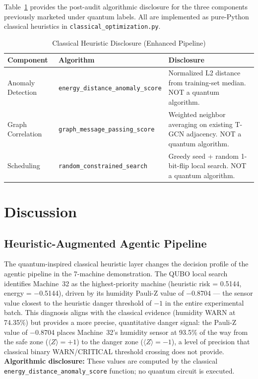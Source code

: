 Table~\ref{tab:heuristic_disclosure} provides the post-audit algorithmic disclosure for the three components previously marketed under quantum labels. All are implemented as pure-Python classical heuristics in \texttt{classical\_optimization.py}.

\begin{table}[htbp]
\centering
\caption{Classical Heuristic Disclosure (Enhanced Pipeline)}
\label{tab:heuristic_disclosure}
\begin{tabular}{lll}
\hline
\textbf{Component} & \textbf{Algorithm} & \textbf{Disclosure} \\
\hline
Anomaly Detection & \texttt{energy\_distance\_anomaly\_score} & Normalized L2 distance from training-set median. NOT a quantum algorithm. \\
Graph Correlation & \texttt{graph\_message\_passing\_score} & Weighted neighbor averaging on existing T-GCN adjacency. NOT a quantum algorithm. \\
Scheduling & \texttt{random\_constrained\_search} & Greedy seed + random 1-bit-flip local search. NOT a quantum algorithm. \\
\hline
\end{tabular}
\end{table}


\section{Discussion}

\subsection{Heuristic-Augmented Agentic Pipeline}

The quantum-inspired classical heuristic layer changes the decision profile of the agentic pipeline in the 7-machine demonstration. The QUBO local search identifies Machine~32 as the highest-priority machine (heuristic risk = 0.5144, energy = $-$0.5144), driven by its humidity Pauli-Z value of $-$0.8704 --- the sensor value closest to the heuristic danger threshold of $-1$ in the entire experimental batch. This diagnosis aligns with the classical evidence (humidity WARN at 74.35\%) but provides a more precise, quantitative danger signal: the Pauli-Z value of $-$0.8704 places Machine~32's humidity sensor at 93.5\% of the way from the safe zone ($\langle Z \rangle = +1$) to the danger zone ($\langle Z \rangle = -1$), a level of precision that classical binary WARN/CRITICAL threshold crossing does not provide. \textbf{Algorithmic disclosure:} These values are computed by the classical \texttt{energy\_distance\_anomaly\_score} function; no quantum circuit is executed.

